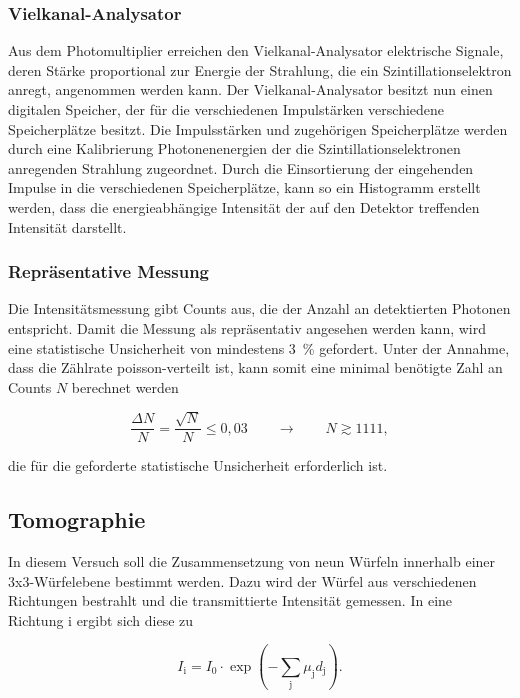         \subsubsection*{Vielkanal-Analysator}
          Aus dem Photomultiplier erreichen den Vielkanal-Analysator elektrische Signale, deren Stärke proportional zur Energie der Strahlung, die ein Szintillationselektron anregt, angenommen werden kann. 
          Der Vielkanal-Analysator besitzt nun einen digitalen Speicher, der für die verschiedenen Impulstärken verschiedene Speicherplätze besitzt. Die Impulsstärken und zugehörigen Speicherplätze werden
          durch eine Kalibrierung Photonenenergien der die Szintillationselektronen anregenden Strahlung zugeordnet. Durch die Einsortierung der eingehenden Impulse in die verschiedenen Speicherplätze, kann so 
          ein Histogramm erstellt werden, dass die energieabhängige Intensität der auf den Detektor treffenden Intensität darstellt.

        \subsubsection*{Repräsentative Messung}
          Die Intensitätsmessung gibt Counts aus, die der Anzahl an detektierten Photonen entspricht. Damit die Messung als repräsentativ angesehen werden kann, wird eine statistische Unsicherheit von 
          mindestens \SI{3}{\percent} gefordert. Unter der Annahme, dass die Zählrate poisson-verteilt ist, kann somit eine minimal benötigte Zahl an Counts $N$ berechnet werden

          \begin{equation*}
            \frac{\Delta N}{N} = \frac{\sqrt{N}}{N} \le 0,03 \qquad \rightarrow \qquad N \gtrsim 1111,
          \end{equation*}

          die für die geforderte statistische Unsicherheit erforderlich ist.


      \subsection{Tomographie}
          In diesem Versuch soll die Zusammensetzung von neun Würfeln innerhalb einer 3x3-Würfelebene bestimmt werden. Dazu wird der Würfel aus verschiedenen Richtungen bestrahlt und die transmittierte 
          Intensität gemessen. In eine Richtung i ergibt sich diese zu

          \begin{equation}
            I_{\text{i}} = I_0 \cdot \exp\left(-\sum_{\text{j}} \mu_{\text{j}} d_{\text{j}} \right).
            \label{eqn:I_i}
          \end{equation}

